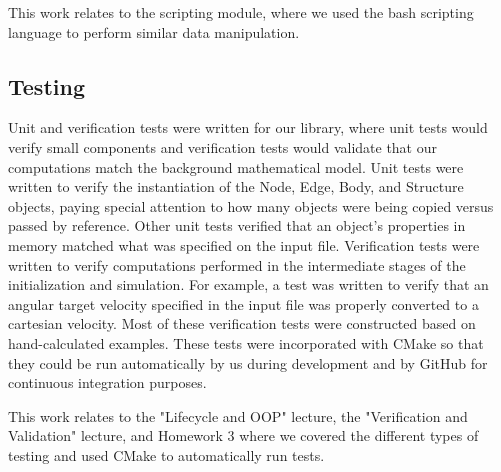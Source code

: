 This work relates to the scripting module, where we used the bash scripting language to perform similar data manipulation.
\subsection{Testing}
Unit and verification tests were written for our library, where unit tests would verify small components and verification tests would validate that our computations match the background mathematical model. Unit tests were written to verify the instantiation of the Node, Edge, Body, and Structure objects, paying special attention to how many objects were being copied versus passed by reference. Other unit tests verified that an object's properties in memory matched what was specified on the input file. Verification tests were written to verify computations performed in the intermediate stages of the initialization and simulation. For example, a test was written to verify that an angular target velocity specified in the input file was properly converted to a cartesian velocity. Most of these verification tests were constructed based on hand-calculated examples. These tests were incorporated with CMake so that they could be run automatically by us during development and by GitHub for continuous integration purposes.

This work relates to the "Lifecycle and OOP" lecture, the "Verification and Validation" lecture, and Homework 3 where we covered the different types of testing and used CMake to automatically run tests.


